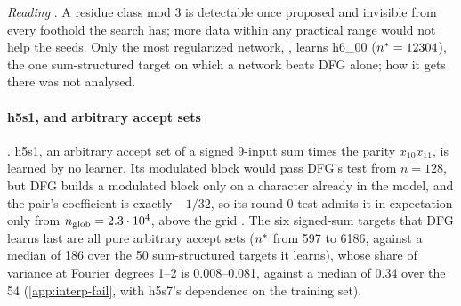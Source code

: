 \begin{table}[tbp]
\centering{\footnotesize\setlength{\tabcolsep}{2.6pt}
}
\caption{The three residue classes mod 3 . $B$: the block's $k$ signed inputs that equal $+1$. $W_1+W_2$: the exact Fourier weight at degrees 1 and 2 ; ``peak'': the degree with the most weight. True block: the first grid $n$ at which its test passes on the seed-0 rows, and its statistic over the threshold at $n=16384$ (Part~10, same code) . Search's seeds: the signal-to-noise ratio of one pair-matrix entry inside the block at $n=16384$, and the $n$ from which the top eigenvector would point at the block . DFG alone: the test error at $n=16384$, equal in its three seeds to the minority rate. Sources:  (\texttt{P4.targets}),  and the Part 11 result files, via .}
\label{tab:interp-mod3}
\end{table}

\emph{Reading} . A residue class mod 3 is detectable once proposed and invisible from every foothold the search has; more data within any practical range would not help the seeds. Only the most regularized network, , learns h6\_00 ($n^{*}=12304$), the one sum-structured target on which a network beats DFG alone; how it gets there was not analysed.

\paragraph{h5s1, and arbitrary accept sets} . h5s1, an arbitrary accept set of a signed 9-input sum times the parity $x_{10}x_{11}$, is learned by no learner. Its modulated block would pass DFG's test from $n=128$, but DFG builds a modulated block only on a character already in the model, and the pair's coefficient is exactly $-1/32$, so its round-0 test admits it in expectation only from $n_{\rm glob}=2.3\cdot10^4$, above the grid . The six signed-sum targets that DFG learns last are all pure arbitrary accept sets ($n^{*}$ from 597 to 6186, against a median of 186 over the 50 sum-structured targets it learns), whose share of variance at Fourier degrees 1--2 is 0.008--0.081, against a median of 0.34 over the 54 (\cref{app:interp-fail}, with h5s7's dependence on the training set).

